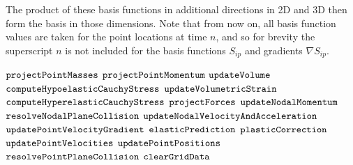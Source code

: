 The product of these basis functions in additional directions in 2D and 3D then form the basis in those dimensions. Note that from now on, all basis function values are taken for the point locations at time $n$, and so for brevity the superscript $n$ is not included for the basis functions $S_{ip}$ and gradients $\nabla S_{ip}$.

\begin{algorithm}
  \caption{${\tt Overall \_ MPM \_ Algorithm}$}
  \begin{algorithmic}[1]
  \State ${\tt projectPointMasses}$
  \State ${\tt projectPointMomentum}$
  	\State ${\tt updateVolume}$
	\State ${\tt computeHypoelasticCauchyStress}$
  	\State ${\tt updateVolumetricStrain}$
	\State ${\tt computeHyperelasticCauchyStress}$ 
  \EndIf
  \State ${\tt projectForces}$ 
  \State ${\tt updateNodalMomentum}$
  \State ${\tt resolveNodalPlaneCollision}$
  \State ${\tt updateNodalVelocityAndAcceleration}$
  \State ${\tt updatePointVelocityGradient}$
  	\State ${\tt elasticPrediction}$
	\State ${\tt plasticCorrection}$
  \EndIf
  \State ${\tt updatePointVelocities}$
  \State ${\tt updatePointPositions}$
  \State ${\tt resolvePointPlaneCollision}$
  \State ${\tt clearGridData}$
  \end{algorithmic}
  \label{alg:MPM_algorithm}
\end{algorithm}


